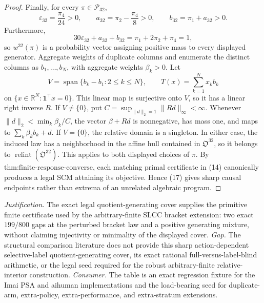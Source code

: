 \documentclass{article}
\begin{document}
\begin{proof}
Finally, for every \(\pi\in\mathcal P_{32}\),
\[
\varepsilon_{32}=\frac{\pi_4}{24}>0,
\qquad
a_{32}=\pi_2-\frac{\pi_4}{8}>0,
\qquad
b_{32}=\pi_1+a_{32}>0.
\tag{18}
\]
Furthermore,
\[
30\varepsilon_{32}+a_{32}+b_{32}=\pi_1+2\pi_2+\pi_4=1,
\]
so \(w^{32}(\pi)\) is a probability vector assigning positive mass to every displayed generator.  Aggregate weights of duplicate columns and enumerate the distinct columns as \(b_1,\ldots,b_N\), with aggregate weights \(\beta_k>0\).  Let
\[
V=\operatorname{span}\{b_k-b_1:2\leq k\leq N\},
\qquad
T(x)=\sum_{k=1}^Nx_kb_k
\]
on \(\{x\in\mathbb R^N:\mathbf 1^{\top}x=0\}\).  This linear map is surjective onto \(V\), so it has a linear right inverse \(R\).  If \(V\neq\{0\}\), put \(C=\sup_{\|d\|_2=1}\|Rd\|_\infty<\infty\).  Whenever \(\|d\|_2<\min_k\beta_k/C\), the vector \(\beta+Rd\) is nonnegative, has mass one, and maps to \(\sum_k\beta_kb_k+d\).  If \(V=\{0\}\), the relative domain is a singleton.  In either case, the induced law has a neighborhood in the affine hull contained in \(\mathfrak O^{32}\), so it belongs to \(\operatorname{relint}(\mathfrak O^{32})\).  This applies to both displayed choices of \(\pi\).  By \(\text{thm:finite-response-converse}\), each matching primal certificate in (14) canonically produces a legal SCM attaining its objective.  Hence (17) gives sharp causal endpoints rather than extrema of an unrelated algebraic program.
\end{proof}
\par\smallskip\noindent \textit{Justification.} The exact legal quotient-generating cover supplies the primitive finite certificate used by the arbitrary-finite SLCC bracket extension: two exact \(199/800\) gaps at the perturbed bracket law and a positive generating mixture, without claiming injectivity or minimality of the displayed cover. \textit{Gap.} The structural comparison literature does not provide this sharp action-dependent selective-label quotient-generating cover, its exact rational full-versus-label-blind arithmetic, or the legal seed required for the robust arbitrary-finite relative-interior construction. \textit{Consumer.} The table is an exact regression fixture for the Imai PSA and aihuman implementations and the load-bearing seed for duplicate-arm, extra-policy, extra-performance, and extra-stratum extensions.
\end{document}
